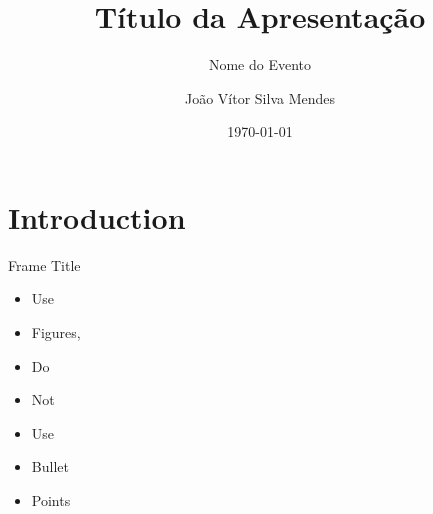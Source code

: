 \documentclass{cubeamer}
\title{Título da Apresentação}
\subtitle{Nome do Evento}
\author[João Vítor Silva Mendes]{João Vítor Silva Mendes}
\date{\today} %
\institute[SENAI CIMATEC]{SENAI CIMATEC -  STUDENT BRANCH CHAPTER - ROBOTICS AND AUTOMATION SOCIETY}
\begin{document}
\maketitle

\cutoc

\section{Introduction}

\begin{frame}{Frame Title}
    \begin{itemize}
        \item Use
        \item Figures,
        \item Do
        \item Not
        \item Use
        \item Bullet
        \item Points
    \end{itemize}
\end{frame}
\end{document}

